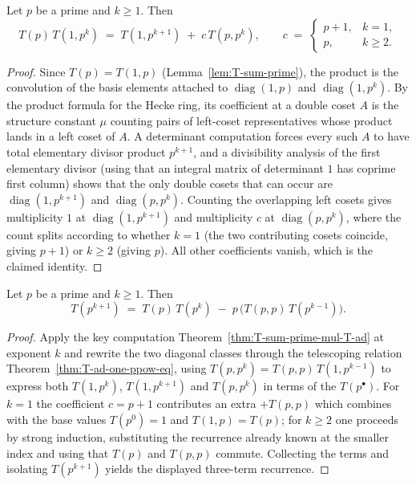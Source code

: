 \begin{theorem}\label{thm:T-sum-prime-mul-T-ad}
\leanok
Let $p$ be a prime and $k\ge 1$. Then
\[
  T(p)\,T(1,p^k) \;=\; T(1,p^{k+1}) \;+\; c\,T(p,p^k),
  \qquad
  c \;=\;
  \begin{cases}
    p+1, & k=1,\\
    p,   & k\ge 2.
  \end{cases}
\]
\end{theorem}

\begin{proof}
\leanok
Since $T(p)=T(1,p)$ (Lemma~\ref{lem:T-sum-prime}), the product is the convolution of the basis
elements attached to $\operatorname{diag}(1,p)$ and $\operatorname{diag}(1,p^k)$. By the product
formula for the Hecke ring, its coefficient at a double coset $A$ is the structure constant
$\mu$ counting pairs of left-coset representatives whose product lands in a left coset of $A$.
A determinant computation forces every such $A$ to have total elementary divisor product
$p^{k+1}$, and a divisibility analysis of the first elementary divisor (using that an integral
matrix of determinant $1$ has coprime first column) shows that the only double cosets that can
occur are $\operatorname{diag}(1,p^{k+1})$ and $\operatorname{diag}(p,p^k)$. Counting the
overlapping left cosets gives multiplicity $1$ at $\operatorname{diag}(1,p^{k+1})$ and
multiplicity $c$ at $\operatorname{diag}(p,p^k)$, where the count splits according to whether
$k=1$ (the two contributing cosets coincide, giving $p+1$) or $k\ge 2$ (giving $p$). All other
coefficients vanish, which is the claimed identity.
\end{proof}

\begin{theorem}\label{thm:T-sum-ppow-recurrence}
\leanok
Let $p$ be a prime and $k\ge 1$. Then
\[
  T(p^{k+1}) \;=\; T(p)\,T(p^k) \;-\; p\,\bigl(T(p,p)\,T(p^{k-1})\bigr).
\]
\end{theorem}

\begin{proof}
\leanok
Apply the key computation Theorem~\ref{thm:T-sum-prime-mul-T-ad} at exponent $k$ and rewrite the
two diagonal classes through the telescoping relation Theorem~\ref{thm:T-ad-one-ppow-eq}, using
$T(p,p^k)=T(p,p)\,T(1,p^{k-1})$ to express both $T(1,p^k)$, $T(1,p^{k+1})$ and $T(p,p^k)$ in
terms of the $T(p^\bullet)$. For $k=1$ the coefficient $c=p+1$ contributes an extra $+T(p,p)$
which combines with the base values $T(p^0)=1$ and $T(1,p)=T(p)$; for $k\ge 2$ one proceeds by
strong induction, substituting the recurrence already known at the smaller index and using that
$T(p)$ and $T(p,p)$ commute. Collecting the terms and isolating $T(p^{k+1})$ yields the displayed
three-term recurrence.
\end{proof}

